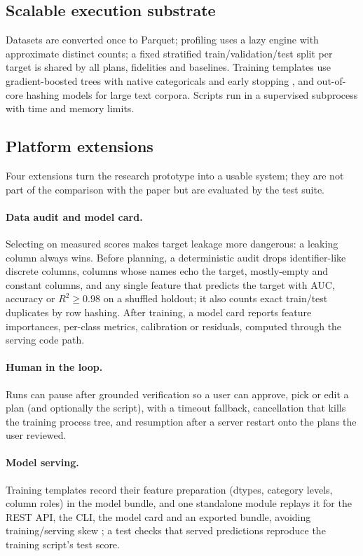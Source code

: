 \subsection{Scalable execution substrate}
Datasets are converted once to Parquet; profiling uses a lazy engine with approximate distinct counts; a fixed stratified train/validation/test split per target is shared by all plans, fidelities and baselines. Training templates use gradient-boosted trees with native categoricals and early stopping \citep{ke2017lightgbm}, and out-of-core hashing models for large text corpora. Scripts run in a supervised subprocess with time and memory limits.

\subsection{Platform extensions}
Four extensions turn the research prototype into a usable system; they are not part of the comparison with the paper but are evaluated by the test suite.

\paragraph{Data audit and model card.} Selecting on measured scores makes target leakage \citep{kaufman2012leakage} more dangerous: a leaking column always wins. Before planning, a deterministic audit drops identifier-like discrete columns, columns whose names echo the target, mostly-empty and constant columns, and any single feature that predicts the target with AUC, accuracy or $R^2 \ge 0.98$ on a shuffled holdout; it also counts exact train/test duplicates by row hashing. After training, a model card \citep{mitchell2019modelcards} reports feature importances, per-class metrics, calibration or residuals, computed through the serving code path.

\paragraph{Human in the loop.} Runs can pause after grounded verification so a user can approve, pick or edit a plan (and optionally the script), with a timeout fallback, cancellation that kills the training process tree, and resumption after a server restart onto the plans the user reviewed.

\paragraph{Model serving.} Training templates record their feature preparation (dtypes, category levels, column roles) in the model bundle, and one standalone module replays it for the REST API, the CLI, the model card and an exported bundle, avoiding training/serving skew \citep{sculley2015debt}; a test checks that served predictions reproduce the training script's test score.

